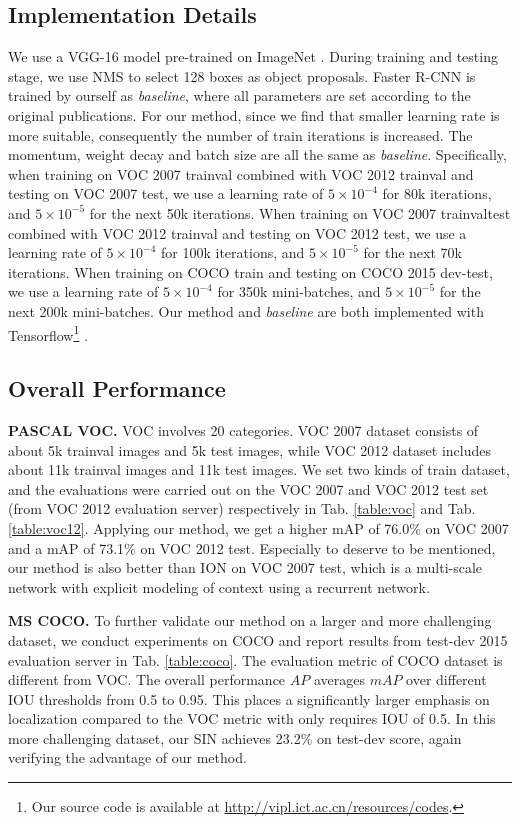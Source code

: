\documentclass[10pt,twocolumn,letterpaper]{article}
\begin{document}
\subsection{Implementation Details}
{We use a VGG-16 model pre-trained on ImageNet \cite{imagenet}. During training and testing stage, we use NMS \cite{NMS} to select 128 boxes as object proposals. Faster R-CNN is trained by ourself as {\em baseline}, where all parameters are set according to the original publications. For our method, since we find that smaller learning rate is more suitable, consequently the number of train iterations is increased. The momentum, weight decay and batch size are all the same as {\em baseline}. Specifically, when training on VOC 2007 trainval combined with VOC 2012 trainval and testing on VOC 2007 test, we use a learning rate of $5\times10^{-4}$ for 80k iterations, and $5\times10^{-5}$ for the next 50k iterations. When training on VOC 2007 trainvaltest combined with VOC 2012 trainval and testing on VOC 2012 test, we use a learning rate of $5\times10^{-4}$ for 100k iterations, and $5\times10^{-5}$ for the next 70k iterations. When training on COCO train and testing on COCO 2015 dev-test, we use a learning rate of $5\times10^{-4}$ for 350k mini-batches, and $5\times10^{-5}$ for the next 200k mini-batches. Our method and {\em baseline} are both implemented with Tensorflow\footnote {Our source code is available at \href{http://vipl.ict.ac.cn/resources/codes}{http://vipl.ict.ac.cn/resources/codes}.} {\cite{TF}}.

\subsection{Overall Performance}
{\bf PASCAL VOC.} VOC involves 20 categories. VOC 2007 dataset consists of about 5k trainval images and 5k test images, while VOC 2012 dataset includes about 11k trainval images and 11k test images. We set two kinds of train dataset, and the evaluations were carried out on the VOC 2007 and VOC 2012 test set (from VOC 2012 evaluation server) respectively in Tab. \ref{table:voc} and Tab. \ref{table:voc12}. Applying our method, we get a higher mAP of 76.0\% on VOC 2007 and a mAP of 73.1\% on VOC 2012 test. Especially to deserve to be mentioned, our method is also better than ION \cite{ION} on VOC 2007 test, which is a multi-scale network with explicit modeling of context using a recurrent network. 

{\bf MS COCO.} To further validate our method on a larger and more challenging dataset, we conduct experiments on COCO and report results from test-dev 2015 evaluation server in Tab. \ref{table:coco}. The evaluation metric of COCO dataset is different from VOC. The overall performance $AP$ averages $mAP$ over different IOU thresholds from 0.5 to 0.95. This places a significantly larger emphasis on localization compared to the VOC metric with only requires IOU of 0.5. In this more challenging dataset, our SIN achieves 23.2\% on test-dev score, again verifying the advantage of our method.

}
\end{document}
